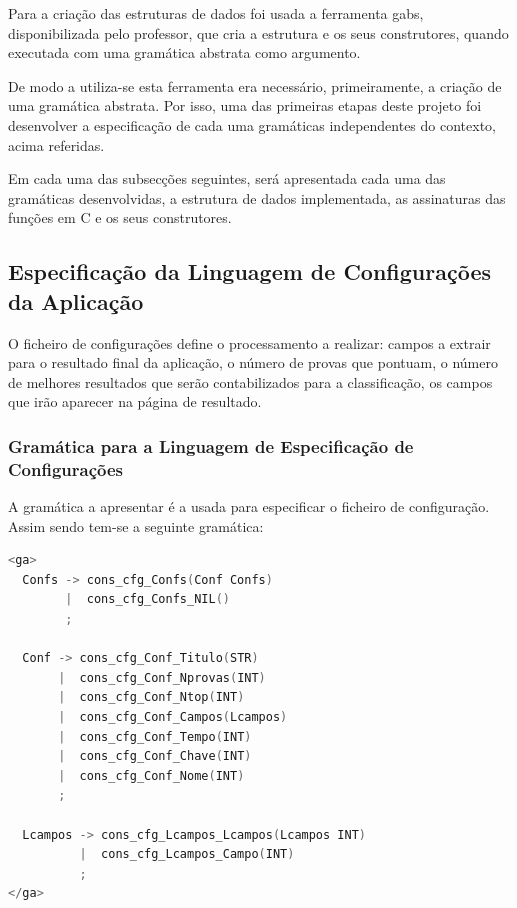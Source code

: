 \documentclass[11pt, a4paper, oneside]{article}
\begin{document}
Para a criação das estruturas de dados foi usada a ferramenta \textsf{gabs}, disponibilizada pelo professor, que cria a estrutura e os seus construtores, quando executada com uma gramática abstrata como argumento.

De modo a utiliza-se esta ferramenta era necessário, primeiramente, a criação de uma gramática abstrata. Por isso, uma das primeiras etapas deste projeto foi desenvolver a especificação de cada uma gramáticas independentes do contexto, acima referidas. 

Em cada uma das subsecções seguintes, será apresentada cada uma das gramáticas desenvolvidas, a estrutura de dados implementada, as assinaturas das funções em \textsf{C} e os seus construtores.

\subsection{Especificação da Linguagem de Configurações da Aplicação}

O ficheiro de configurações define o processamento a realizar: campos a extrair para o resultado final da aplicação, o número de provas que pontuam, o número de melhores resultados que serão contabilizados para a classificação, os campos que irão aparecer na página de resultado.
\newpage

\subsubsection{Gramática para a Linguagem de Especificação de Configurações}

A gramática a apresentar é a usada para especificar o ficheiro de configuração. Assim sendo tem-se a seguinte gramática:

\begin{lstlisting}[language=C, caption={Gramática para a linguagem de especificação de configurações.}]
<ga>
  Confs -> cons_cfg_Confs(Conf Confs)
        |  cons_cfg_Confs_NIL()
        ;

  Conf -> cons_cfg_Conf_Titulo(STR)
       |  cons_cfg_Conf_Nprovas(INT)
       |  cons_cfg_Conf_Ntop(INT)
       |  cons_cfg_Conf_Campos(Lcampos)
       |  cons_cfg_Conf_Tempo(INT)
       |  cons_cfg_Conf_Chave(INT)
       |  cons_cfg_Conf_Nome(INT)
       ;

  Lcampos -> cons_cfg_Lcampos_Lcampos(Lcampos INT)
          |  cons_cfg_Lcampos_Campo(INT)
          ;
</ga>
\end{lstlisting}
\end{document}
